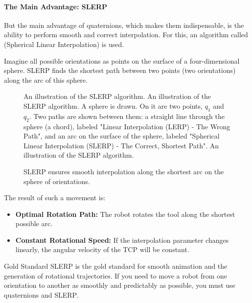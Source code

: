 \paragraph{The Main Advantage: SLERP}
But the main advantage of quaternions, which makes them indispensable, is the ability to perform smooth and correct interpolation. For this, an algorithm called  (Spherical Linear Interpolation) is used.

Imagine all possible orientations as points on the surface of a four-dimensional sphere. SLERP finds the shortest path between two points (two orientations) along the arc of this sphere.

\newpage
\begin{figure}[h!]
    \centering
    \begin{infobox}{ An illustration of the SLERP algorithm.}
        An illustration of the SLERP algorithm. A sphere is drawn. On it are two points, $q_1$ and $q_2$. Two paths are shown between them: a straight line through the sphere (a chord), labeled "Linear Interpolation (LERP) - The Wrong Path", and an arc on the surface of the sphere, labeled "Spherical Linear Interpolation (SLERP) - The Correct, Shortest Path".
        An illustration of the SLERP algorithm.
    \end{infobox}
    \caption{SLERP ensures smooth interpolation along the shortest arc on the sphere of orientations.}
    \label{fig:slerp_interpolation}
\end{figure}

The result of such a movement is:
\begin{itemize}
    \item \textbf{Optimal Rotation Path:} The robot rotates the tool along the shortest possible arc.
    \item \textbf{Constant Rotational Speed:} If the interpolation parameter changes linearly, the angular velocity of the TCP will be constant.
\end{itemize}



\begin{tipbox}{Gold Standard}
SLERP is the gold standard for smooth animation and the generation of rotational trajectories. If you need to move a robot from one orientation to another as smoothly and predictably as possible, you must use quaternions and SLERP.
\end{tipbox}


